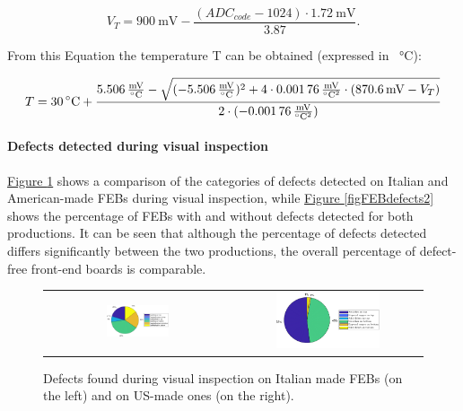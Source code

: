 \begin{equation}
    V_{T} = \SI{900}{\milli\volt} - \frac{(ADC_{code} - 1024) \cdot \SI{1.72}{\milli\volt}}{3.87}.
\end{equation}

\noindent
From this Equation the temperature T can be obtained (expressed in \SI{}{\celsius}):

\begin{equation}
    T = \SI{30}{\celsius} + \frac{\SI{5.506}{\frac{\milli\volt}{\celsius}} - \sqrt{(\SI{-5.506}{\frac{\milli\volt}{\celsius}})^2 + 4 \cdot \SI{0.00176}{\frac{\milli\volt}{\celsius^2}} \cdot (\SI{870.6}{\milli\volt} - V_{T})}}{2 \cdot (\SI{-0.00176}{\frac{\milli\volt}{\celsius^2}})}
\end{equation}

\paragraph{Defects detected during visual inspection} \hyperref[figFEBdefects1]{Figure \ref{figFEBdefects1}} shows a comparison of the categories of defects detected on Italian and American-made FEBs during visual inspection, while \hyperref[figFEBdefects2]{Figure \ref{figFEBdefects2}} shows the percentage of FEBs with and without defects detected for both productions. It can be seen that although the percentage of defects detected differs significantly between the two productions, the overall percentage of defect-free front-end boards is comparable.

\begin{figure}[h!]
    \centering
    \begin{tabular}{cc}
        \includegraphics[width=0.35\textwidth]{Images/chap2/results/defects_category_IT.pdf} & \includegraphics[width=0.58\textwidth]{Images/chap2/results/defects_category_US.pdf}\\
    \end{tabular}
    \caption{Defects found during visual inspection on Italian made FEBs (on the left) and on US-made ones (on the right).}
    \label{figFEBdefects1}
\end{figure}

